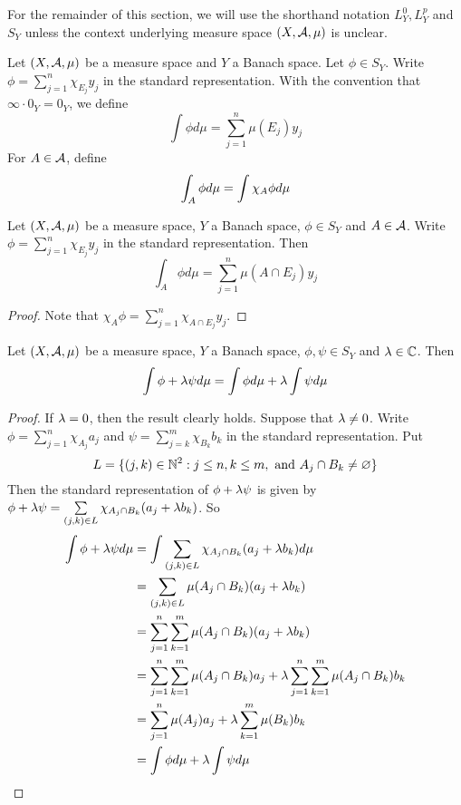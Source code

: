 \documentclass{book}
\begin{document}
	\begin{note}
	For the remainder of this section, we will use the shorthand notation $L^0_Y, L^p_Y$ and $S_Y$ unless the context underlying measure space $(X, \mathcal{A}, \mu)$ is unclear.
	\end{note}
	
	\begin{defn}  
	Let $(X, \mathcal{A}, \mu)$ be a measure space and $Y$ a Banach space. Let $\phi \in S_Y$. Write $\phi = \sum\limits_{j=1}^n\chi_{E_j}y_j$ in the standard representation. With the convention that $\infty \cdot 0_Y = 0_Y$, we define $$\int \phi d\mu = \sum\limits_{j=1}^n \mu(E_j)y_j $$ For $A \in \mathcal{A}$, define  $$\int_A \phi d \mu = \int \chi_A \phi d\mu \\$$
	\end{defn}
	
	\begin{ex}  
	Let $(X, \mathcal{A}, \mu)$ be a measure space, $Y$ a Banach space, $\phi \in S_Y$ and $A \in \mathcal{A}$. Write $\phi = \sum\limits_{j=1}^n\chi_{E_j}y_j$ in the standard representation. Then $$\int_A \phi d\mu = \sum_{j=1}^n \mu(A \cap E_j)y_j$$
	\end{ex}
	
	\begin{proof}
	Note that $\chi_A \phi = \sum\limits_{j=1}^n\chi_{A \cap E_j}y_j$.
	\end{proof}		
	
	\begin{ex}  
	Let $(X, \mathcal{A}, \mu)$ be a measure space, $Y$ a Banach space, $\phi, \psi \in S_Y$ and $\lambda \in \mathbb{C}$. Then $$\int \phi + \lambda \psi d\mu = \int \phi d \mu + \lambda \int \psi d\mu $$
	\end{ex}
	
	\begin{proof}
	If $\lambda =0$, then the result clearly holds. Suppose that $\lambda \neq 0$.	Write $\phi = \sum\limits_{j=1}^n\chi_{A_j}a_j$ and $\psi = \sum\limits_{j=k}^m\chi_{B_k}b_k$ in the standard representation. Put $$L = \{(j,k) \in \mathbb{N}^2: j \leq n, k \leq m, \text{ and } A_j \cap B_k \neq \varnothing\}$$ Then the standard representation of $\phi + \lambda \psi$ is given by  $\phi + \lambda \psi = \sum\limits_{(j,k) \in L} \chi_{A_j \cap B_k}(a_j + \lambda b_k)$.
	So 
	\begin{align*}
	\int \phi + \lambda \psi d \mu 
	&= \int \sum_{(j,k) \in L} \chi_{A_j \cap B_k}(a_j + \lambda b_k) d \mu \\
	&= \sum_{(j,k) \in L} \mu(A_j \cap B_k)(a_j + \lambda b_k) \\
	&= \sum_{j = 1}^n \sum_{k=1}^m \mu(A_j \cap B_k)(a_j + \lambda b_k)  \\ 
	&= \sum_{j = 1}^n \sum_{k=1}^m \mu(A_j \cap B_k)a_j + \lambda \sum_{j = 1}^n \sum_{k=1}^m \mu(A_j \cap B_k) b_k \\
	&= \sum_{j = 1}^n \mu(A_j)a_j +  \lambda\sum_{k=1}^m \mu(B_k) b_k \\
	&= \int \phi d \mu + \lambda \int \psi d\mu 
	\end{align*}
	\end{proof}
\end{document}
